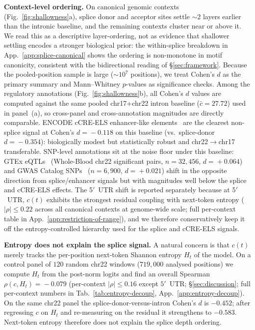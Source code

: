 \documentclass{article}
\theoremstyle{plain}
\theoremstyle{definition}
\theoremstyle{remark}
\begin{document}
\textbf{Context-level ordering.} On canonical genomic contexts (Fig.~\ref{fig:shallowness}a), splice donor and acceptor sites settle $\sim 2$ layers earlier than the intronic baseline, and the remaining contexts cluster near or above it. We read this as a descriptive layer-ordering, not as evidence that shallower settling encodes a stronger biological prior: the within-splice breakdown in App.~\ref{app:splice-canonical} shows the ordering is non-monotone in motif canonicity, consistent with the bidirectional reading of \S\ref{sec:framework}. Because the pooled-position sample is large ($\sim\!10^7$ positions), we treat Cohen's $d$ as the primary summary and Mann--Whitney $p$-values as significance checks. Among the regulatory annotations (Fig.~\ref{fig:shallowness}b), all Cohen's $d$ values are computed against the same pooled chr17+chr22 intron baseline ($\bar c\!=\!27.72$) used in panel~(a), so cross-panel and cross-annotation magnitudes are directly comparable. ENCODE cCRE-ELS enhancer-like elements~\cite{moore2020encode} are the clearest non-splice signal at Cohen's $d\!=\!-0.118$ on this baseline (vs.\ splice-donor $d\!=\!-0.354$): biologically modest but statistically robust and chr22$\to$chr17 transferable. SNP-level annotations sit at the noise floor under this baseline: GTEx eQTLs~\cite{gtex2020} (Whole-Blood chr22 significant pairs, $n\!=\!32{,}456$, $d\!=\!+0.064$) and GWAS Catalog SNPs~\cite{sollis2023gwas} ($n\!=\!6{,}900$, $d\!=\!+0.021$) shift in the opposite direction from splice/enhancer signals but with magnitudes well below the splice and cCRE-ELS effects. The 5$'$~UTR shift is reported separately because at 5$'$~UTR, $c(t)$ exhibits the strongest residual coupling with next-token entropy ($|\rho|\!\le\!0.22$ across all canonical contexts at genome-wide scale; full per-context table in App.~\ref{app:restriction-of-range}), and we therefore conservatively keep it off the entropy-controlled hierarchy used for the splice and cCRE-ELS signals.

\textbf{Entropy does not explain the splice signal.} A natural concern is that $c(t)$ merely tracks the per-position next-token Shannon entropy $H_t$ of the model. On a control panel of $120$ random chr22 windows ($719{,}000$ analysed positions) we compute $H_t$ from the post-norm logits and find an overall Spearman $\rho(c, H_t)\!=\!-0.079$ (per-context $|\rho|\!\le\!0.16$ except $5'$~UTR; \S\ref{sec:discussion}; full per-context numbers in Tab.~\ref{tab:entropy-decoup}, App.~\ref{app:entropy-decoup}). On the same chr22 panel the splice-donor-versus-intron Cohen's $d$ is $-0.452$; after regressing $c$ on $H_t$ and re-measuring on the residual it strengthens to $-0.583$. Next-token entropy therefore does not explain the splice depth ordering.
\end{document}
